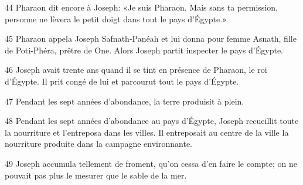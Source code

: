 44 Pharaon dit encore à Joseph: «Je suis Pharaon. Mais sans ta permission, personne ne lèvera le petit doigt dans tout le pays d’Égypte.»

45 Pharaon appela Joseph Safnath-Panéah et lui donna pour femme Asnath, fille de Poti-Phéra, prêtre de One. Alors Joseph partit inspecter le pays d’Égypte.

46 Joseph avait trente ans quand il se tint en présence de Pharaon, le roi d’Égypte. Il prit congé de lui et parcourut tout le pays d’Égypte.

47 Pendant les sept années d’abondance, la terre produisit à plein.

48 Pendant les sept années d’abondance au pays d’Égypte, Joseph recueillit toute la nourriture et l’entreposa dans les villes. Il entreposait au centre de la ville la nourriture produite dans la campagne environnante.

49 Joseph accumula tellement de froment, qu’on cessa d’en faire le compte; on ne pouvait pas plus le mesurer que le sable de la mer.